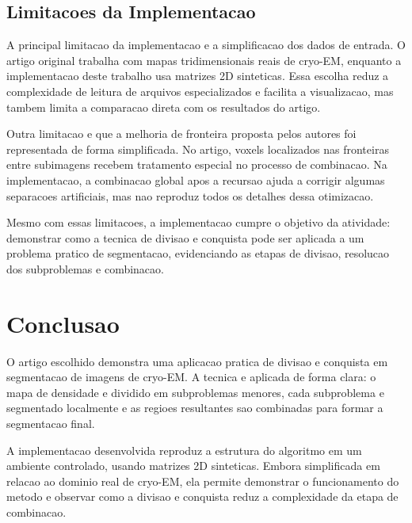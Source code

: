 \documentclass[tcc1]{uftex}
\begin{document}
\section{Limitacoes da Implementacao}

A principal limitacao da implementacao e a simplificacao dos dados de entrada. O artigo original trabalha com mapas tridimensionais reais de cryo-EM, enquanto a implementacao deste trabalho usa matrizes 2D sinteticas. Essa escolha reduz a complexidade de leitura de arquivos especializados e facilita a visualizacao, mas tambem limita a comparacao direta com os resultados do artigo.

Outra limitacao e que a melhoria de fronteira proposta pelos autores foi representada de forma simplificada. No artigo, voxels localizados nas fronteiras entre subimagens recebem tratamento especial no processo de combinacao. Na implementacao, a combinacao global apos a recursao ajuda a corrigir algumas separacoes artificiais, mas nao reproduz todos os detalhes dessa otimizacao.

Mesmo com essas limitacoes, a implementacao cumpre o objetivo da atividade: demonstrar como a tecnica de divisao e conquista pode ser aplicada a um problema pratico de segmentacao, evidenciando as etapas de divisao, resolucao dos subproblemas e combinacao.

\chapter{Conclusao}

O artigo escolhido demonstra uma aplicacao pratica de divisao e conquista em segmentacao de imagens de cryo-EM. A tecnica e aplicada de forma clara: o mapa de densidade e dividido em subproblemas menores, cada subproblema e segmentado localmente e as regioes resultantes sao combinadas para formar a segmentacao final.

A implementacao desenvolvida reproduz a estrutura do algoritmo em um ambiente controlado, usando matrizes 2D sinteticas. Embora simplificada em relacao ao dominio real de cryo-EM, ela permite demonstrar o funcionamento do metodo e observar como a divisao e conquista reduz a complexidade da etapa de combinacao.

\backmatter


\end{document}
